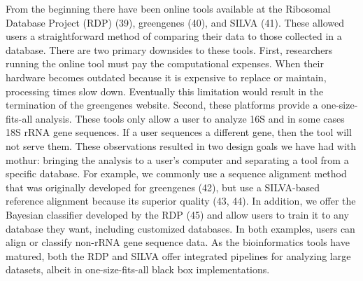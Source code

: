 \documentclass[11pt,]{article}
\begin{document}
From the beginning there have been online tools available at the
Ribosomal Database Project (RDP) (39), greengenes (40), and SILVA (41).
These allowed users a straightforward method of comparing their data to
those collected in a database. There are two primary downsides to these
tools. First, researchers running the online tool must pay the
computational expenses. When their hardware becomes outdated because it
is expensive to replace or maintain, processing times slow down.
Eventually this limitation would result in the termination of the
greengenes website. Second, these platforms provide a one-size-fits-all
analysis. These tools only allow a user to analyze 16S and in some cases
18S rRNA gene sequences. If a user sequences a different gene, then the
tool will not serve them. These observations resulted in two design
goals we have had with mothur: bringing the analysis to a user's
computer and separating a tool from a specific database. For example, we
commonly use a sequence alignment method that was originally developed
for greengenes (42), but use a SILVA-based reference alignment because
its superior quality (43, 44). In addition, we offer the 
Bayesian classifier developed by the RDP (45) and allow users to train
it to any database they want, including customized databases. In both
examples, users can align or classify non-rRNA gene sequence data. As
the bioinformatics tools have matured, both the RDP and SILVA offer
integrated pipelines for analyzing large datasets, albeit in
one-size-fits-all black box implementations.
\end{document}

